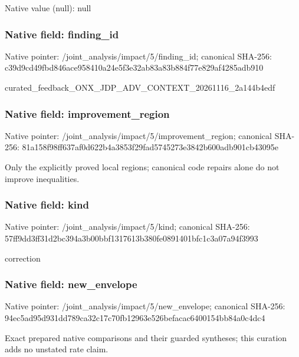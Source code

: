 \documentclass[10pt,a4paper]{article}
\begin{document}
Native value (null): null

\subsubsection{Native field: finding\_\allowbreak{}id}
Native pointer: /joint\_\allowbreak{}analysis/impact/5/finding\_\allowbreak{}id; canonical SHA-256: c39d9cd49fbd846ace958410a24e5f3e32ab83a83b884f77e829af4285adb910

\begingroup\raggedright\sloppy curated\_\allowbreak{}feedback\_\allowbreak{}ONX\_\allowbreak{}JDP\_\allowbreak{}ADV\_\allowbreak{}CONTEXT\_\allowbreak{}20261116\_\allowbreak{}2a144b4edf\par\endgroup

\subsubsection{Native field: improvement\_\allowbreak{}region}
Native pointer: /joint\_\allowbreak{}analysis/impact/5/improvement\_\allowbreak{}region; canonical SHA-256: 81a158f98ff637af0d622b4a3853f29fad5745273e3842b600adb901cb43095e

\begingroup\raggedright\sloppy Only the explicitly proved local regions;\allowbreak{} canonical code repairs alone do not improve inequalities.\par\endgroup

\subsubsection{Native field: kind}
Native pointer: /joint\_\allowbreak{}analysis/impact/5/kind; canonical SHA-256: 57ff9dd3ff31d2bc394a3b00bbf1317613b380fe0891401bfc1c3a07a94f3993

\begingroup\raggedright\sloppy correction\par\endgroup

\subsubsection{Native field: new\_\allowbreak{}envelope}
Native pointer: /joint\_\allowbreak{}analysis/impact/5/new\_\allowbreak{}envelope; canonical SHA-256: 94ec5ad95d931dd789ca32c17c70fb12963e526befacac6400154bb84a0c4dc4

\begingroup\raggedright\sloppy Exact prepared native comparisons and their guarded syntheses;\allowbreak{} this curation adds no unstated rate claim.\par\endgroup
\end{document}
